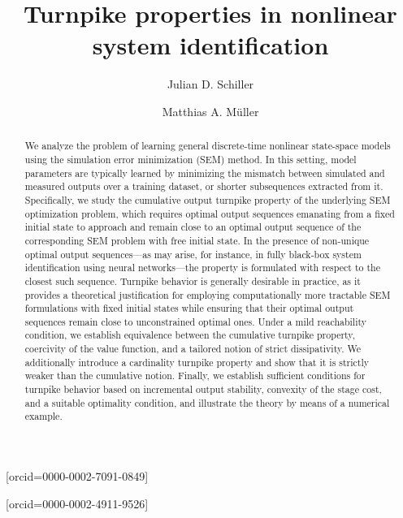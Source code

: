 \documentclass[a4paper,fleqn]{cas-dc}
\begin{document}
\let\WriteBookmarks\relax
\def\floatpagepagefraction{1}
\def\textpagefraction{.001}


\title [mode = title]{Turnpike properties in nonlinear system identification}  
\tnotemark[1] 

\author[]{Julian D. Schiller}[orcid=0000-0002-7091-0849]
\cormark[1]

\author[]{Matthias A. Müller}[orcid=0000-0002-4911-9526]



\begin{abstract}
	We analyze the problem of learning general discrete-time nonlinear state-space models using the simulation error minimization (SEM) method. In this setting, model parameters are typically learned by minimizing the mismatch between simulated and measured outputs over a training dataset, or shorter subsequences extracted from it. Specifically, we study the cumulative output turnpike property of the underlying SEM optimization problem, which requires optimal output sequences emanating from a fixed initial state to approach and remain close to an optimal output sequence of the corresponding SEM problem with free initial state. In the presence of non-unique optimal output sequences---as may arise, for instance, in fully black-box system identification using neural networks---the property is formulated with respect to the closest such sequence. Turnpike behavior is generally desirable in practice, as it provides a theoretical justification for employing computationally more tractable SEM formulations with fixed initial states while ensuring that their optimal output sequences remain close to unconstrained optimal ones. Under a mild reachability condition, we establish equivalence between the cumulative turnpike property, coercivity of the value function, and a tailored notion of strict dissipativity. We additionally introduce a cardinality turnpike property and show that it is strictly weaker than the cumulative notion. Finally, we establish sufficient conditions for turnpike behavior based on incremental output stability, convexity of the stage cost, and a suitable optimality condition, and illustrate the theory by means of a numerical example.
\end{abstract}
\end{document}
